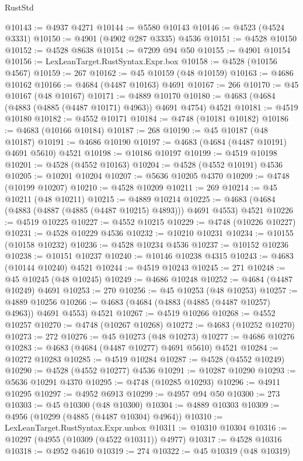 \begin{lexlean}{RustStd}
\begin{coremodule}
@10143 := @4937 @4271
@10144 := @5580 @10143
@10146 := @4523 (@4524 @3331)
@10150 := @4901 (@4902 @287 @3335) @4536
@10151 := @4528 @10150
@10152 := @4528 @8638
@10154 := @7209 @94 @50
@10155 := @4901 @10154
@10156 := LexLeanTarget.RustSyntax.Expr.box
@10158 := @4528 (@10156 @4567)
@10159 := 267
@10162 := @45 @10159 (@48 @10159)
@10163 := @4686 @10162
@10166 := @4684 (@4487 @10163) @4691
@10167 := 266
@10170 := @45 @10167 (@48 @10167)
@10171 := @4889 @10170
@10180 := @4683 (@4684 (@4883 (@4885 (@4487 @10171) @4963)) @4691 @4754) @4521
@10181 := @4519 @10180
@10182 := @4552 @10171
@10184 := @4748 (@10181 @10182)
@10186 := @4683 (@10166 @10184)
@10187 := 268
@10190 := @45 @10187 (@48 @10187)
@10191 := @4686 @10190
@10197 := @4683 (@4684 (@4487 @10191) @4691 @5610) @4521
@10198 := @10186 @10197
@10199 := @4519 @10198
@10201 := @4528 (@4552 @10163)
@10204 := @4528 (@4552 @10191) @4536
@10205 := @10201 @10204
@10207 := @5636 @10205 @4370
@10209 := @4748 (@10199 @10207)
@10210 := @4528 @10209
@10211 := 269
@10214 := @45 @10211 (@48 @10211)
@10215 := @4889 @10214
@10225 := @4683 (@4684 (@4883 (@4887 (@4885 (@4487 @10215) @4893))) @4691 @4553) @4521
@10226 := @4519 @10225
@10227 := @4552 @10215
@10229 := @4748 (@10226 @10227)
@10231 := @4528 @10229 @4536
@10232 := @10210 @10231
@10234 := @10155 (@10158 @10232)
@10236 := @4528 @10234 @4536
@10237 := @10152 @10236
@10238 := @10151 @10237
@10240 := @10146 @10238 @4315
@10243 := @4683 (@10144 @10240) @4521
@10244 := @4519 @10243
@10245 := 271
@10248 := @45 @10245 (@48 @10245)
@10249 := @4686 @10248
@10252 := @4684 (@4487 @10249) @4691
@10253 := 270
@10256 := @45 @10253 (@48 @10253)
@10257 := @4889 @10256
@10266 := @4683 (@4684 (@4883 (@4885 (@4487 @10257) @4963)) @4691 @4553) @4521
@10267 := @4519 @10266
@10268 := @4552 @10257
@10270 := @4748 (@10267 @10268)
@10272 := @4683 (@10252 @10270)
@10273 := 272
@10276 := @45 @10273 (@48 @10273)
@10277 := @4686 @10276
@10283 := @4683 (@4684 (@4487 @10277) @4691 @5610) @4521
@10284 := @10272 @10283
@10285 := @4519 @10284
@10287 := @4528 (@4552 @10249)
@10290 := @4528 (@4552 @10277) @4536
@10291 := @10287 @10290
@10293 := @5636 @10291 @4370
@10295 := @4748 (@10285 @10293)
@10296 := @4911 @10295
@10297 := @4952 @6913
@10299 := @4957 @94 @50
@10300 := 273
@10303 := @45 @10300 (@48 @10300)
@10304 := @4889 @10303
@10309 := @4956 (@10299 (@4885 (@4487 @10304) @4964))
@10310 := LexLeanTarget.RustSyntax.Expr.unbox
@10311 := @10310 @10304
@10316 := @10297 (@4955 (@10309 (@4522 @10311)) @4977)
@10317 := @4528 @10316
@10318 := @4952 @4610
@10319 := 274
@10322 := @45 @10319 (@48 @10319)

\end{coremodule}
\end{lexlean}
